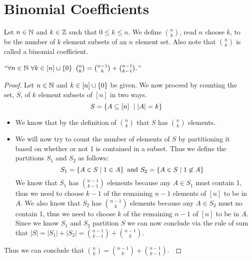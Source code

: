     \section{Binomial Coefficients}
        \begin{definition}
            Let $n \in \mathbb{N}$ and $k \in \mathbb{Z}$ such that $0 \le k \le n$.
            We define $\binom{n}{k}$, read $n$ choose $k$, to be the number of
            $k$ element subsets of an $n$ element set. Also note that $\binom{n}{k}$
            is called a binomial coefficient.
        \end{definition}
        \begin{lemma}
            $``\forall n \in \mathbb{N} \ \forall k \in [n] \cup \left\{0\right\} \
            \binom{n}{k} = \binom{n - 1}{k} + \binom{n - 1}{k - 1}.$''
            \label{rec binom lemma}
        \end{lemma}
        \begin{proof}
            Let $n \in \mathbb{N}$ and $k \in [n] \cup \left\{0\right\}$ be given. We now proceed
            by counting the set, $S$, of $k$ element subsets of $[n]$ in two ways.
            \[
                S = \left\{A \subseteq [n] \  \mid |A| = k\right\}
            \]
            \begin{itemize}
                \item
                    We know that by the definition of $\binom{n}{k}$ that $S$ has $\binom{n}{k}$
                    elements.
                \item
                    We will now try to count the number of elements of $S$ by partitioning it
                    based on whether or not 1 is contained in a subset. Thus we define the
                    partitions $S_1$ and $S_2$ as follows:
                    \[
                        S_1 = \left\{A \in S \mid 1 \in A\right\} \mbox{ and } S_2 = \left\{A \in S \mid 1 \not\in A\right\}
                    \]
                    We know that $S_1$ has $\binom{n - 1}{k - 1}$ elements because
                    any $A \in S_1$ must contain 1, thus we need to choose
                    $k - 1$ of the remaining $n - 1$ elements of $[n]$ to be in $A$. We also
                    know that $S_2$ has $\binom{n - 1}{k}$ elements because any $A \in S_2$ must
                    no contain 1, thus we need to choose $k$ of the remaining $n - 1$ of $[n]$ to
                    be in $A$. Since we know $S_1$ and $S_2$ partition $S$ we can now conclude
                    via the rule of sum that $|S| = |S_1| + |S_2| = \binom{n - 1}{k - 1} + \binom{n - 1}{k}.$
            \end{itemize}
            Thus we can conclude that $\binom{n}{k} = \binom{n - 1}{k} + \binom{n - 1}{k - 1}$.~\QED
        \end{proof}
